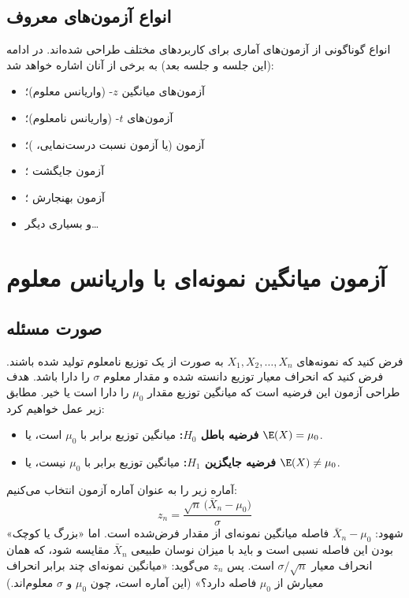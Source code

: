 \subsection{انواع آزمون‌های معروف}
انواع گوناگونی از آزمون‌های آماری برای کاربردهای مختلف طراحی شده‌اند. در ادامه (این جلسه و جلسه بعد) به برخی از آنان اشاره خواهد شد:
\begin{itemize}
\item آزمون‌های میانگین $z$- (واریانس معلوم)؛
\item آزمون‌های $t$- (واریانس نامعلوم)؛
\item آزمون  (یا آزمون نسبت درست‌نمایی، )؛
\item آزمون جایگشت ؛
\item آزمون بهنجارش ؛
\item و بسیاری دیگر\ldots
\end{itemize}

\section{آزمون میانگین نمونه‌ای با واریانس معلوم }

\subsection{صورت مسئله}
فرض کنید که نمونه‌های $X_1,X_2,\ldots,X_n$ به صورت  از یک توزیع نامعلوم تولید شده باشند. فرض کنید که انحراف معیار توزیع دانسته شده و مقدار معلوم $\sigma$ را دارا باشد. هدف طراحی آزمون این فرضیه است که میانگین توزیع مقدار $\mu_0$ را دارا است یا خیر. مطابق زیر عمل خواهیم کرد:
\begin{itemize}
\item \textbf{فرضیه باطل $H_0$:} میانگین توزیع برابر با $\mu_0$ است، یا $\E(X)=\mu_0$.
\item \textbf{فرضیه جایگزین $H_1$:} میانگین توزیع برابر با $\mu_0$ نیست، یا $\E(X)\neq\mu_0$.
\end{itemize}
آماره زیر را به عنوان آماره آزمون انتخاب می‌کنیم:
\[
\boxed{\ z_n=\frac{\sqrt n\,\big(\bar X_n-\mu_0\big)}{\sigma}\ }
\]
شهود: $\bar X_n-\mu_0$ فاصله میانگین نمونه‌ای از مقدار فرض‌شده است. اما «بزرگ یا کوچک» بودن این فاصله نسبی است و باید با میزان نوسان طبیعی $\bar X_n$ مقایسه شود، که همان انحراف معیار $\sigma/\sqrt n$ است. پس $z_n$ می‌گوید: «میانگین نمونه‌ای چند برابر انحراف معیارش از $\mu_0$ فاصله دارد؟» (این آماره است، چون $\mu_0$ و $\sigma$ معلوم‌اند.)

